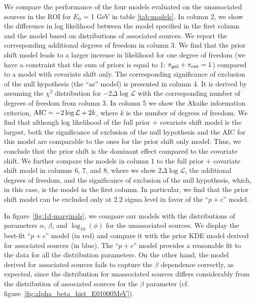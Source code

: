 \documentclass[12pt, a4paper]{article}
\begin{document}
We compare the performance of the four models evaluated on the unassociated sources in the ROI for $E_0$ = 1 GeV in table \ref{tab:models}.
In column 2, we show the difference in log likelihood between the model specified in the first column and the model based on distributions of associated sources.
We report the corresponding additional degrees of freedom in column 3.
We find that the prior shift model leads to a larger increase in likelihood for one degree of freedom (we have a constraint that the sum of priors is equal to 1: $\pi_{\rm gal} + \pi_{\rm ext} =1$) compared to a model with covariate shift only.
The corresponding significance of exclusion of the null hypothesis (the ``as'' model) is presented in column 4.
It is derived by assuming the $\chi^2$ distribution for $-2\Delta \log \mathcal{L}$ with the corresponding number of degrees of freedom from column 3.
In column 5 we show the Akaike information criterion, ${\rm AIC} = -2\log\mathcal{L} + 2 k$, where $k$ is the number of degrees of freedom.
We find that although log likelihood of the full prior $+$ covariate shift model is the largest,
both the significance of exclusion of the null hypothesis and the AIC for this model are comparable to the ones for the prior shift only model.
Thus, we conclude that the prior shift is the dominant effect compared to the covariate shift.
We further compare the models in column 1 to the full prior $+$ covariate shift model in columns 6, 7, and 8, where we show $2\Delta \log \mathcal{L}$, the additional degrees of freedom, and the significance of exclusion of the null hypothesis, which, in this case, is the model in the first column.
In particular, we find that the prior shift model can be excluded only at 2.2 sigma level in favor of the ``$p + c$'' model.


In figure~\ref{fig:1d-marginals},
we compare our models with the distributions of parameters $\alpha$, $\beta$, and $\log_{10}(\phi)$ for the unassociated sources. 
We display the best-fit ``$p+c$'' model (in red) and compare it with the prior KDE model derived for associated sources (in blue).
The ``$p+c$'' model provides a reasonable fit to the data for all the distribution parameters. On the other hand, the model derived for associated sources fails to capture the $\beta$ dependence correctly, as expected, since the distribution for unassociated sources differs considerably from the distribution of associated sources for the $\beta$ parameter (cf. figure~\ref{fig:alpha_beta_hist_E01000MeV}). 
\end{document}

